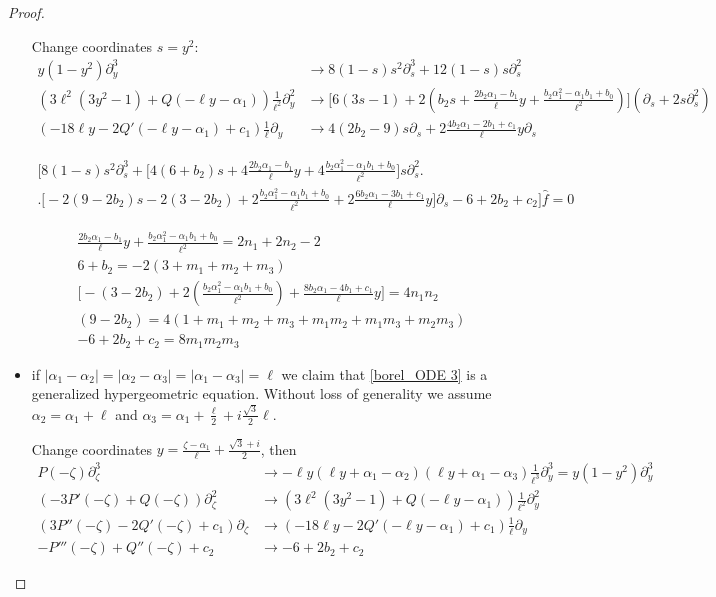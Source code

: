 \documentclass[11pt,a4paper,twoside,leqno,noamsfonts]{amsart}
\numberwithin{equation}{section}
\begin{document}
\begin{proof}
\begin{itemize}
Change coordinates $s=y^2$:
\begin{align*}
y(1-y^2)\partial_y^3&\longrightarrow 8(1-s)s^2\partial_s^3+12(1-s)s\partial_s^2\\
(3\ell^{2}(3y^2-1)+Q(-\ell y-\alpha_1))\frac{1}{\ell^2}\partial_y^2&\longrightarrow \big[6(3s-1)+2(b_2s+\frac{2b_2\alpha_1-b_1}{\ell}y+\frac{b_2\alpha_1^2-\alpha_1b_1+b_0}{\ell^2})\big](\partial_s+2s\partial_s^2)\\
(-18\ell y-2Q'(-\ell y-\alpha_1)+c_1)\frac{1}{\ell}\partial_y&\longrightarrow 4(2b_2-9)s\partial_s+2\frac{4b_2\alpha_1-2b_1+c_1}{\ell}y\partial_s
\end{align*}

\begin{multline}
\Big[8(1-s)s^2\partial_s^3+\big[4(6+b_2)s+4\frac{2b_2\alpha_1-b_1}{\ell}y+4\frac{b_2\alpha_1^2-\alpha_1b_1+b_0}{\ell^2}\big]s\partial_s^2\Big.\\
\Big.\big[-2(9-2b_2)s-2(3-2b_2)+2\frac{b_2\alpha_1^2-\alpha_1b_1+b_0}{\ell^2}+2\frac{6b_2\alpha_1-3b_1+c_1}{\ell}y\big]\partial_s-6+2b_2+c_2\Big]\hat{f}=0
\end{multline}

\begin{align*}
\frac{2b_2\alpha_1-b_1}{\ell}y+\frac{b_2\alpha_1^2-\alpha_1b_1+b_0}{\ell^2}=2n_1+2n_2-2\\
6+b_2=-2(3+m_1+m_2+m_3)\\
\big[-(3-2b_2)+2(\frac{b_2\alpha_1^2-\alpha_1b_1+b_0}{\ell^2})+\frac{8b_2\alpha_1-4b_1+c_1}{\ell}y\big]=4n_1n_2\\
(9-2b_2)=4(1+m_1+m_2+m_3+m_1m_2+m_1m_3+m_2m_3)\\
-6+2b_2+c_2=8m_1m_2m_3
\end{align*}
\color{black}
\item if $|\alpha_1-\alpha_2|=|\alpha_2-\alpha_3|=|\alpha_1-\alpha_3|=\ell$ we claim that \eqref{borel_ODE 3} is a generalized hypergeometric equation. Without loss of generality we assume $\alpha_2=\alpha_1+\ell$ and $\alpha_3=\alpha_1+\frac{\ell}{2}+i\frac{\sqrt{3}}{2}\ell$.

Change coordinates $y=\frac{\zeta-\alpha_1}{\ell}+\frac{\sqrt{3}+i}{2}$, then 
\begin{align*}
P(-\zeta)\partial_\zeta^3&\longrightarrow -\ell y(\ell y+\alpha_1-\alpha_2)(\ell y+\alpha_1-\alpha_3)\frac{1}{\ell^3}\partial_y^3=y(1-y^2)\partial_y^3\\
(-3P'(-\zeta)+Q(-\zeta))\partial_\zeta^2&\longrightarrow (3\ell^{2}(3y^2-1)+Q(-\ell y-\alpha_1))\frac{1}{\ell^2}\partial_y^2\\
(3P''(-\zeta)-2Q'(-\zeta)+c_1)\partial_\zeta&\longrightarrow(-18\ell y-2Q'(-\ell y-\alpha_1)+c_1)\frac{1}{\ell}\partial_y\\
-P'''(-\zeta)+Q''(-\zeta)+c_2&\longrightarrow -6+2b_2+c_2
\end{align*} 
\end{itemize}





\end{proof}




\end{document}
